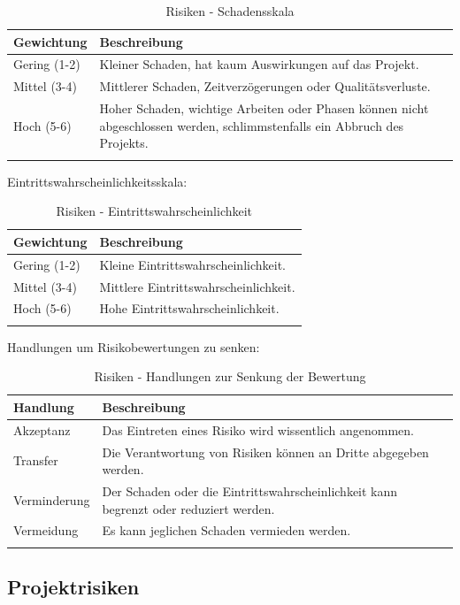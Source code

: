 \begin{longtable}[]{@{}lp{11cm}@{}}
  \toprule
  \textbf{Gewichtung} & \textbf{Beschreibung}\tabularnewline
  \midrule
  \endhead
  Gering (1-2)        & Kleiner Schaden, hat kaum Auswirkungen auf das Projekt.\tabularnewline
  Mittel (3-4)        & Mittlerer Schaden, Zeitverzögerungen oder Qualitätsverluste.\tabularnewline
  Hoch (5-6)          & Hoher Schaden, wichtige Arbeiten oder Phasen können nicht abgeschlossen werden, schlimmstenfalls ein Abbruch des Projekts.\tabularnewline
  \bottomrule
  \caption{Risiken - Schadensskala}
\end{longtable}

Eintrittswahrscheinlichkeitsskala:

\begin{longtable}[]{@{}lp{12cm}@{}}
  \toprule
  \textbf{Gewichtung} & \textbf{Beschreibung}\tabularnewline
  \midrule
  \endhead
  Gering (1-2)        & Kleine Eintrittswahrscheinlichkeit.\tabularnewline
  Mittel (3-4)        & Mittlere Eintrittswahrscheinlichkeit.\tabularnewline
  Hoch (5-6)          & Hohe Eintrittswahrscheinlichkeit.\tabularnewline
  \bottomrule
  \caption{Risiken - Eintrittswahrscheinlichkeit}
\end{longtable}

Handlungen um Risikobewertungen zu senken:

\begin{longtable}[]{@{}lp{12cm}@{}}
  \toprule
  \textbf{Handlung} & \textbf{Beschreibung}\tabularnewline
  \midrule
  \endhead
  Akzeptanz         & Das Eintreten eines Risiko wird wissentlich angenommen.\tabularnewline
  Transfer          & Die Verantwortung von Risiken können an Dritte abgegeben werden.\tabularnewline
  Verminderung      & Der Schaden oder die Eintrittswahrscheinlichkeit kann begrenzt oder reduziert werden.\tabularnewline
  Vermeidung        & Es kann jeglichen Schaden vermieden werden.\tabularnewline
  \bottomrule
  \caption{Risiken - Handlungen zur Senkung der Bewertung}
\end{longtable}


\clearpage
\subsection{Projektrisiken}\label{projektrisiken}

